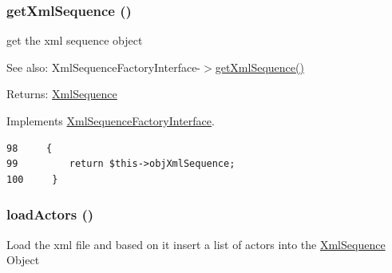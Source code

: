 \hypertarget{class_xml_sequence_factory_xml_feb0ab0d5955fcae20ff5062fa59fd79}{
\subsubsection[{getXmlSequence}]{\setlength{\rightskip}{0pt plus 5cm}getXmlSequence ()}}
\label{class_xml_sequence_factory_xml_feb0ab0d5955fcae20ff5062fa59fd79}


get the xml sequence object

\begin{Desc}
\item[See also:]XmlSequenceFactoryInterface-$>$\hyperlink{class_xml_sequence_factory_xml_feb0ab0d5955fcae20ff5062fa59fd79}{getXmlSequence()} \end{Desc}
\begin{Desc}
\item[Returns:]\hyperlink{class_xml_sequence}{XmlSequence} \end{Desc}


Implements \hyperlink{interface_xml_sequence_factory_interface_feb0ab0d5955fcae20ff5062fa59fd79}{XmlSequenceFactoryInterface}.

\begin{Code}\begin{verbatim}98     {
99         return $this->objXmlSequence;   
100     }
\end{verbatim}
\end{Code}


\hypertarget{class_xml_sequence_factory_xml_390c089130460866b440b2f6f73dd136}{
\subsubsection[{loadActors}]{\setlength{\rightskip}{0pt plus 5cm}loadActors ()}}
\label{class_xml_sequence_factory_xml_390c089130460866b440b2f6f73dd136}


Load the xml file and based on it insert a list of actors into the \hyperlink{class_xml_sequence}{XmlSequence} Object 


